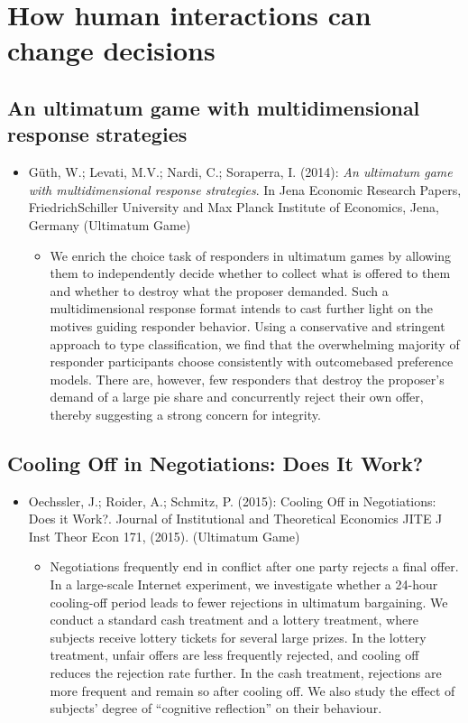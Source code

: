 
\chapter{How human interactions can change decisions}

\section{An ultimatum game with multidimensional response strategies} 

\begin{itemize}
	\item Güth, W.; Levati, M.V.; Nardi, C.; Soraperra, I. (2014): \textit{An ultimatum game with multidimensional response strategies}. In Jena Economic Research Papers, FriedrichSchiller University and Max Planck Institute of Economics, Jena, Germany (Ultimatum Game)
		\begin{itemize}
			\item We enrich the choice task of responders in ultimatum games by allowing them to independently decide whether to collect what is offered to them and whether to destroy what the proposer demanded. Such a multidimensional response format intends to cast further light on the motives guiding responder behavior. Using a conservative and stringent approach to type classification, we find that the overwhelming majority of responder participants choose consistently with outcomebased preference models. There are, however, few responders that destroy the proposer's demand of a large pie share and concurrently reject their own offer, thereby suggesting a strong concern for integrity.
		\end{itemize}
\end{itemize}

\section{Cooling Off in Negotiations: Does It Work?}

\begin{itemize}
	\item Oechssler, J.; Roider, A.; Schmitz, P. (2015): Cooling Off in Negotiations: Does it Work?. Journal of Institutional and Theoretical Economics JITE J Inst Theor Econ 171, (2015). (Ultimatum Game)
		\begin{itemize}
			\item Negotiations frequently end in conflict after one party rejects a final offer. In a large-scale Internet experiment, we investigate whether a 24-hour cooling-off period leads to fewer rejections in ultimatum bargaining. We conduct a standard cash treatment and a lottery treatment, where subjects receive lottery tickets for several large prizes. In the lottery treatment, unfair offers are less frequently rejected, and cooling off reduces the rejection rate further. In the cash treatment, rejections are more frequent and remain so after cooling off. We also study the effect of subjects’ degree of “cognitive reflection” on their behaviour.
		\end{itemize}
\end{itemize}